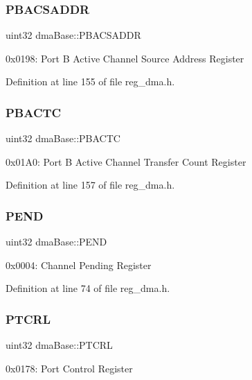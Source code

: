 \subsubsection{\texorpdfstring{P\+B\+A\+C\+S\+A\+D\+DR}{PBACSADDR}}
{\footnotesize\ttfamily uint32 dma\+Base\+::\+P\+B\+A\+C\+S\+A\+D\+DR}

0x0198\+: Port B Active Channel Source Address Register 

Definition at line 155 of file reg\+\_\+dma.\+h.

\mbox{\label{structdmaBase_a79384a5b4027112b8d79911be59466a4}} 
\subsubsection{\texorpdfstring{P\+B\+A\+C\+TC}{PBACTC}}
{\footnotesize\ttfamily uint32 dma\+Base\+::\+P\+B\+A\+C\+TC}

0x01\+A0\+: Port B Active Channel Transfer Count Register 

Definition at line 157 of file reg\+\_\+dma.\+h.

\mbox{\label{structdmaBase_ac6cfb5425326d4d66114cf22b25ba0b0}} 
\subsubsection{\texorpdfstring{P\+E\+ND}{PEND}}
{\footnotesize\ttfamily uint32 dma\+Base\+::\+P\+E\+ND}

0x0004\+: Channel Pending Register 

Definition at line 74 of file reg\+\_\+dma.\+h.

\mbox{\label{structdmaBase_ab3cebac4b60664cfbae621eadb6aadf6}} 
\subsubsection{\texorpdfstring{P\+T\+C\+RL}{PTCRL}}
{\footnotesize\ttfamily uint32 dma\+Base\+::\+P\+T\+C\+RL}

0x0178\+: Port Control Register 

